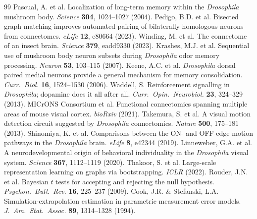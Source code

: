 \documentclass[10pt]{article}
\begin{document}
\begin{thebibliography}{99}
 Pascual, A. et al. Localization of long-term memory within the \textit{Drosophila} mushroom body. \textit{Science} \textbf{304}, 1024--1027 (2004).
 Pedigo, B.D. et al. Bisected graph matching improves automated pairing of bilaterally homologous neurons from connectomes. \textit{eLife} \textbf{12}, e80664 (2023).
 Winding, M. et al. The connectome of an insect brain. \textit{Science} \textbf{379}, eadd9330 (2023).
 Krashes, M.J. et al. Sequential use of mushroom body neuron subsets during \textit{Drosophila} odor memory processing. \textit{Neuron} \textbf{53}, 103--115 (2007).
 Keene, A.C. et al. \textit{Drosophila} dorsal paired medial neurons provide a general mechanism for memory consolidation. \textit{Curr.\ Biol.} \textbf{16}, 1524--1530 (2006).
 Waddell, S. Reinforcement signalling in \textit{Drosophila}; dopamine does it all after all. \textit{Curr.\ Opin.\ Neurobiol.} \textbf{23}, 324--329 (2013).
 MICrONS Consortium et al. Functional connectomics spanning multiple areas of mouse visual cortex. \textit{bioRxiv} (2021).
 Takemura, S. et al. A visual motion detection circuit suggested by \textit{Drosophila} connectomics. \textit{Nature} \textbf{500}, 175--181 (2013).
 Shinomiya, K. et al. Comparisons between the ON- and OFF-edge motion pathways in the \textit{Drosophila} brain. \textit{eLife} \textbf{8}, e42344 (2019).
 Linneweber, G.A. et al. A neurodevelopmental origin of behavioral individuality in the \textit{Drosophila} visual system. \textit{Science} \textbf{367}, 1112--1119 (2020).
 Thakoor, S. et al. Large-scale representation learning on graphs via bootstrapping. \textit{ICLR} (2022).
 Rouder, J.N. et al. Bayesian $t$ tests for accepting and rejecting the null hypothesis. \textit{Psychon.\ Bull.\ Rev.} \textbf{16}, 225--237 (2009).
 Cook, J.R. \& Stefanski, L.A. Simulation-extrapolation estimation in parametric measurement error models. \textit{J.\ Am.\ Stat.\ Assoc.} \textbf{89}, 1314--1328 (1994).
\end{thebibliography}
\end{document}
